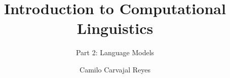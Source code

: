 \documentclass[UKenglish]{beamer}
\author{Camilo Carvajal Reyes}
\title{Introduction to Computational Linguistics}
\subtitle{Part 2: Language Models}
\begin{document}
\iffalse %
\begin{frame}{Standard Frame}
\vspace{0.3cm}\\
    \textbf{Lorem ipsum dolor sit amet}, consectetur adipiscing elit, sed do eiusmod tempor incididunt ut labore et dolore magna aliqua. Ut enim ad minim veniam, quis nostrud exercitation ullamco laboris nisi ut aliquip ex ea commodo consequat. Duis aute irure dolor in reprehenderit in voluptate velit esse cillum dolore eu fugiat nulla pariatur.
\begin{textblock}{0.15}(0.07, 0.45)
        \texttt{[image: images/horizontal\_figure.png]}
\end{textblock}
\end{frame}

\begin{frame}{Standard Frame}
\vspace{0.3cm}\\
\begin{columns}[onlytextwidth]
    \begin{column}{0.50\textwidth}
    The algorithm is awesome:
    \begin{itemize}
        \item Reason 1
        \item Reason 2
        \item Reason 3
        \item Reason 4
        \item Reason 5
        \item Reason 6
        \item Reason 7
        \item Reason 8
    \end{itemize}
    \end{column}
\end{columns}
\begin{textblock}{0.5}(0.55, 0.25)
        \texttt{[image: images/vertical\_figure.png]}
\end{textblock}
\end{frame}
\fi
\end{document}
